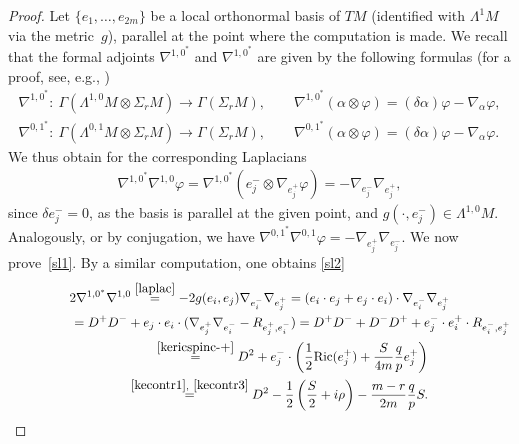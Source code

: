 \documentclass[pdftex]{sigma}
\numberwithin{equation}{section}
\theoremstyle{definition}
\begin{document}
\begin{proof}
Let $\{e_1,\dots, e_{2m}\}$ be a local orthonormal basis of $TM$ (identif\/ied with $\Lambda^1 M$ via the met\-ric~$g$), parallel at the point where the computation is made. We recall that the formal adjoints $\nabla^{{1,0}^*}$ and $\nabla^{{1,0}^*}$ are given by the following formulas (for a proof, see, e.g., \cite[Lemma~20.1]{am_lectures})
\begin{gather*}
\nabla^{{1,0}^*}\colon \ \Gamma(\Lambda^{1,0}M\otimes\Sigma_{r}M) \longrightarrow \Gamma(\Sigma_{r}M), \qquad \nabla^{{1,0}^*}(\alpha\otimes \varphi)=(\delta\alpha)\varphi-\nabla_
{\alpha}\varphi,\\
 \nabla^{{0,1}^*}\colon \ \Gamma(\Lambda^{0,1}M\otimes\Sigma_{r}M) \longrightarrow \Gamma(\Sigma_{r}M), \qquad \nabla^{{0,1}^*}(\alpha\otimes \varphi)=(\delta\alpha)\varphi-\nabla_
{\alpha}\varphi.
\end{gather*}
We thus obtain for the corresponding Laplacians
\begin{gather}\label{laplac}
\nabla^{{1,0}^*}\nabla^{1,0}\varphi
=\nabla^{{1,0}^*}(e^-_j\otimes \nabla_{e^+_j}\varphi)=- \nabla_{e^-_j}\nabla_{e^+_j},
\end{gather}
since $\delta e^-_j=0$, as the basis is  parallel at the given point, and $g(\cdot, e^-_j)\in\Lambda^{1,0}M$. Analogously, or by conjugation, we have $\nabla^{{0,1}^*}\nabla^{0,1}\varphi
=- \nabla_{e^+_j}\nabla_{e^-_j}$.
We now prove~\eqref{sl1}. By a similar computation, one obtains \eqref{sl2}
\begin{gather*}
 2\nabla^{{1,0}^*}\nabla^{1,0} \overset{\eqref{laplac}}{=}-2g(e_i,e_j)\nabla_{e_i^-}\nabla_{e_j^+}=(e_i\cdot e_j + e_j\cdot e_i) \cdot \nabla_{e_i^-}\nabla_{e_j^+}\\
\hphantom{2\nabla^{{1,0}^*}\nabla^{1,0}}{}
  =D^+D^- + e_j\cdot e_i\cdot (\nabla_{e_j^+}\nabla_{e_i^-} - R_{e_j^+,e_i^-})=D^+D^- + D^-D^+ + e_j^-\cdot e^+_i\cdot R_{e_i^-, e_j^+}\\
 \hphantom{2\nabla^{{1,0}^*}\nabla^{1,0}}{}
 \overset{\eqref{kericspinc-+}}{=}D^2+e^-_j\cdot \left( \frac{1}{2}\mathrm{Ric}(e_j^+)+\frac{S}{4m}\frac{q}{p}e_j^+\right)\\
  \hphantom{2\nabla^{{1,0}^*}\nabla^{1,0}}{}
  \overset{\eqref{kecontr1},~\eqref{kecontr3}}{=}D^2 -\frac{1}{2}\left(\frac{S}{2}+i\rho\right)-\frac{m-r}{2m}\frac{q}{p}S.\tag*{\qed}
 \end{gather*}
 \renewcommand{\qed}{}
\end{proof}
\end{document}
